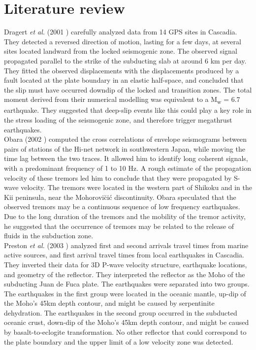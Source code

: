 \documentclass[main.tex]{subfiles}
\begin{document}
\part{Literature review}

Dragert \textit{et al.} (2001 \cite{DRA_2001}) carefully analyzed data from 14 GPS sites in Cascadia. They detected a reversed direction of motion, lasting for a few days, at several sites located landward from the locked seismogenic zone. The observed signal propagated parallel to the strike of the subducting slab at around 6 km per day. They fitted the observed displacements with the displacements produced by a fault located at the plate boundary in an elastic half-space, and concluded that the slip must have occurred downdip of the locked and transition zones. The total moment derived from their numerical modelling was equivalent to a M\textsubscript{w} = 6.7 earthquake. They suggested that deep-slip events like this could play a key role in the stress loading of the seismogenic zone, and therefore trigger megathrust earthquakes. \\

Obara (2002 \cite{OBA_2002}) computed the cross correlations of envelope seismograms between pairs of stations of the Hi-net network in southwestern Japan, while moving the time lag between the two traces. It allowed him to identify long coherent signals, with a predominant frequency of 1 to 10 Hz. A rough estimate of the propagation velocity of these tremors led him to conclude that they were propagated by S-wave velocity. The tremors were located in the western part of Shikoku and in the Kii peninsula, near the Mohorovi\u ci\'c discontinuity. Obara speculated that the observed tremors may be a continuous sequence of low frequency earthquakes. Due to the long duration of the tremors and the mobility of the tremor activity, he suggested that the occurrence of tremors may be related to the release of fluids in the subduction zone. \\

Preston \textit{et al.} (2003 \cite{PRE_2003}) analyzed first and second arrivals travel times from marine active sources, and first arrival travel times from local earthquakes in Cascadia. They inverted their data for 3D P-wave velocity structure, earthquake locations, and geometry of the reflector. They interpreted the reflector as the Moho of the subducting Juan de Fuca plate. The earthquakes were separated into two groups. The earthquakes in the first group were located in the oceanic mantle, up-dip of the Moho's 45km depth contour, and might be caused by serpentinite dehydration. The earthquakes in the second group occurred in the subducted oceanic crust, down-dip of the Moho's 45km depth contour, and might be caused by basalt-to-eclogite transformation. No other reflector that could correspond to the plate boundary and the upper limit of a low velocity zone was detected. \\
\end{document}
